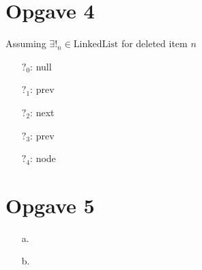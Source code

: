 \documentclass[12pt,a4paper]{article}
\begin{document}
\section{Opgave 4}
Assuming $\exists!_n \in \text{LinkedList}$ for deleted item $n$
\begin{itemize}
\item[$?_0$:] null
\item[$?_1$:] prev
\item[$?_2$:] next 
\item[$?_3$:] prev 
\item[$?_4$:] node 
\end{itemize}

\section{Opgave 5}
\begin{itemize}
\item[a.]

\item[b.]
\end{itemize}
\end{document}
